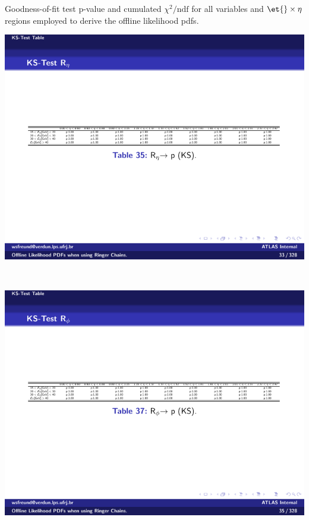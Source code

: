 \begin{table}[b]
\centering
\caption{\label{tab:gof_ks_p_values}Goodness-of-fit test p-value and cumulated
  $\chi^2/\text{ndf}$ for all variables and $\et{}\times\eta{}$
  regions employed to derive the offline likelihood pdfs.}
\begin{subtable}{\textwidth}
\caption{\reta{}\label{tab:gof_ks_p_values_reta}}
\includegraphics[width=\textwidth]{appendices/figures/gof/reta_ks_table.pdf}
\end{subtable} \\
\begin{subtable}{\textwidth}
\caption{\rphi{}\label{tab:gof_ks_p_values_rphi}}
\includegraphics[width=\textwidth]{appendices/figures/gof/rphi_ks_table.pdf}

\end{subtable}
\end{table}
